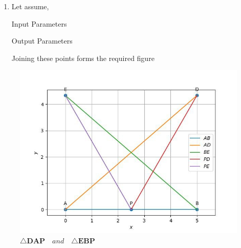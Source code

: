 \documentclass[11pt, a4paper]{article}
\let\vec\mathbf
\begin{document}
\begin{enumerate}
\begin{enumerate}[label=(\roman*)]
\item Let assume, 
\begin{table}[H]
\centering
	
	  \caption{Input Parameters}
	  \label{Table-1: }
\end{table}

\begin{table}[H]
\centering
	
	  \caption{Output Parameters}
	  \label{Table-2: }
\end{table}

Joining these points forms the required figure

\end{enumerate}
\end{enumerate}

\begin{figure}[H]
    \includegraphics[width=\columnwidth]{figs/fig_math_comp}
	\caption{$\triangle \vec{DAP} \hspace{12pt} and \hspace{12pt} \triangle \vec{EBP}$}
    \label{fig:fig2}
\end{figure}
\end{document}

